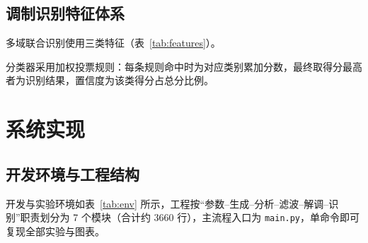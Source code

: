 \documentclass[12pt, a4paper, UTF8]{ctexart}
\begin{document}
\subsection{调制识别特征体系}
\label{sec:features}

多域联合识别使用三类特征（表~\ref{tab:features}）。

\begin{table}[H]
\centering
\caption{调制识别特征体系}
\label{tab:features}
\end{table}

分类器采用加权投票规则：每条规则命中时为对应类别累加分数，最终取得分最高者为识别结果，置信度为该类得分占总分比例。

\section{系统实现}

\subsection{开发环境与工程结构}

开发与实验环境如表~\ref{tab:env} 所示，工程按``参数--生成--分析--滤波--解调--识别''职责划分为 7 个模块（合计约 3660 行），主流程入口为 \texttt{main.py}，单命令即可复现全部实验与图表。
\end{document}
